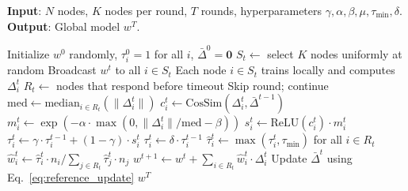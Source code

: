 \begin{algorithm}[t]
    \caption{الگوریتم }
    \label{alg:twac}
    \begin{latin}
        \raggedright
        \textbf{Input}: $N$ nodes, $K$ nodes per round, $T$ rounds, hyperparameters $\gamma, \alpha, \beta, \mu, \tau_{\min}, \delta$.\\
        \vspace{2mm}\textbf{Output}: Global model $w^T$.
        \begin{algorithmic}[1]
            \STATE\vspace{2mm} Initialize $w^0$ randomly, $\tau_i^0 = 1$ for all $i$, $\bar{\Delta}^0 = \mathbf{0}$
                \STATE\vspace{1mm} $S_t \leftarrow$ select $K$ nodes uniformly at random
                \STATE\vspace{1mm} Broadcast $w^t$ to all $i \in S_t$
                \STATE\vspace{1mm} Each node $i \in S_t$ trains locally and computes $\Delta_i^t$
                \STATE\vspace{1mm} $R_t \leftarrow$ nodes that respond before timeout
                    \STATE\vspace{1mm} Skip round; continue
                \ENDIF
                \STATE\vspace{1mm} $\text{med} \leftarrow \text{median}_{i \in R_t}(\|\Delta_i^t\|)$
                    \STATE\vspace{1mm} $c_i^t \leftarrow \text{CosSim}(\Delta_i^t, \bar{\Delta}^{t-1})$
                    \STATE\vspace{1mm} $m_i^t \leftarrow \exp(-\alpha \cdot \max(0, \|\Delta_i^t\| / \text{med} - \beta))$
                    \STATE\vspace{1mm} $s_i^t \leftarrow \text{ReLU}(c_i^t) \cdot m_i^t$
                    \STATE\vspace{1mm} $\tau_i^t \leftarrow \gamma \cdot \tau_i^{t-1} + (1 - \gamma) \cdot s_i^t$
                \ENDFOR
                    \STATE\vspace{1mm} $\tau_i^t \leftarrow \delta \cdot \tau_i^{t-1}$
                \ENDFOR
                \STATE\vspace{1mm} $\hat{\tau}_i^t \leftarrow \max(\tau_i^t, \tau_{\min})$ for all $i \in R_t$
                \STATE\vspace{1mm} $\hat{w}_i^t \leftarrow \hat{\tau}_i^t \cdot n_i / \sum_{j \in R_t} \hat{\tau}_j^t \cdot n_j$
                \STATE\vspace{1mm} $w^{t+1} \leftarrow w^t + \sum_{i \in R_t} \hat{w}_i^t \cdot \Delta_i^t$
                \STATE\vspace{1mm} Update $\bar{\Delta}^t$ using Eq.~\eqref{eq:reference_update}
            \ENDFOR
            \RETURN $w^T$
        \end{algorithmic}
    \end{latin}
\end{algorithm}
